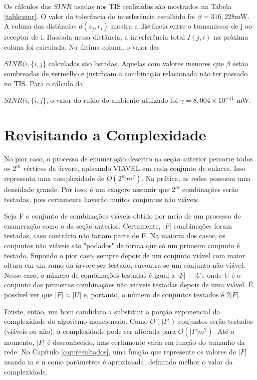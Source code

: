 Os cálculos das $SINR$ usadas nos TIS realizados são mostrados na Tabela \ref{table:sinr}. O valor da tolerância de interferência escolhido foi $\beta=316,228$mW. A coluna das distâncias $d(s_j,r_i)$ mostra a distância entre o transmissor de j ao receptor de i. Baseada nessa distância, a interferência total $I(j,i)$ na próxima coluna foi calculada. Na última coluna, o valor das {$SINR(i, \{i,j\}$  calculadas são listadas. Aquelas com valores menores que $\beta$ estão sombreadas de vermelho e justificam a combinação relacionada não ter passado no TIS. Para o cálculo da {$SINR(i, \{i,j\}$, o valor do ruído do ambiente utilizado foi $\gamma=8,004 \times 10^{-11}$ mW.


\section{Revisitando a Complexidade}
\label{section:complexidade}

No pior caso, o processo de enumeração descrito na seção anterior percorre todos os $2^m$ vértices da árvore, aplicando VIAVEL em cada conjunto de enlaces. Isso representa uma complexidade de $O(2^mm^2)$. Na prática, as redes possuem uma densidade grande. Por isso, é um exagero assumir que $2^m$ combinações serão testadas, pois certamente haverão muitos conjuntos não viáveis. 

Seja F o conjunto de combinações viáveis obtido por meio de um processo de enumeração como o da seção anterior. Certamente, $|F|$ combinações foram testadas, caso contrário não fariam parte de F. Na maioria dos casos, os conjuntos não viáveis são "podados" de forma que só um primeiro conjunto é testado. Supondo o pior caso, sempre depois de um conjunto viável com maior altura em um ramo da árvore ser testado, encontra-se um conjunto não viável. Nesse caso, o número de combinações testadas é igual a $|F| + |U|$, onde U é o conjunto das primeiras combinações não viáveis testadas depois de uma viável. É possível ver que $|F| \approx |U|$ e, portanto, o número de conjuntos testados é $2|F|$. 

Existe, então, um bom candidato a substituir a porção exponencial da complexidade do algoritmo mencionado. Como $O(|F|)$ conjuntos serão testados (viáveis ou não), a complexidade pode ser alterada para $O(|F|m^2)$. Até o momento, $|F|$ é desconhecido, mas certamente varia em função do tamanho da rede. No Capítulo \ref{cap:resultados}, uma função que represente os valores de $|F|$ usando m e n como parâmetros é aproximada, definindo melhor o valor da complexidade.

}}
